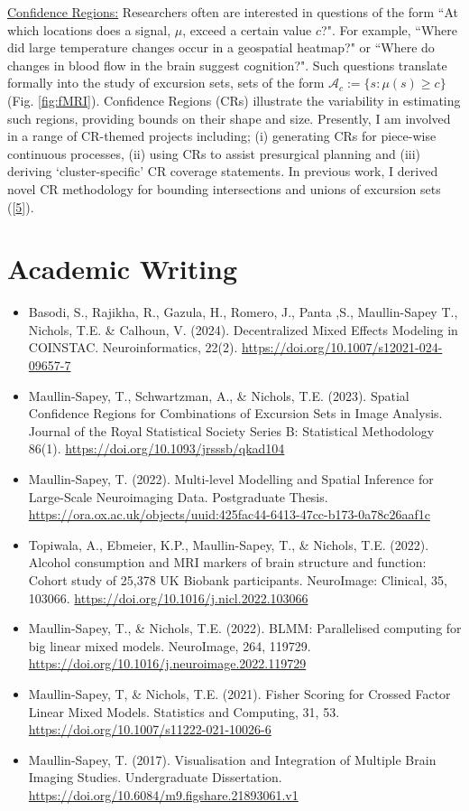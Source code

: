\documentclass{friggeri-cv}
\begin{document}
\underline{Confidence Regions:} Researchers often are interested in questions of the form ``At which locations does a signal, $\mu$, exceed a certain value $c$?". For example, ``Where did large temperature changes occur in a geospatial heatmap?" or ``Where do changes in blood flow in the brain suggest cognition?". Such questions translate formally into the study of excursion sets, sets of the form $\mathcal{A}_c:=\{s:\mu(s)\geq c\}$ (Fig. \ref{fig:fMRI}). Confidence Regions (CRs) illustrate the variability in estimating such regions, providing bounds on their shape and size. Presently, I am involved in a range of CR-themed projects including; (i) generating CRs for piece-wise continuous processes, (ii) using CRs to assist presurgical planning and (iii) deriving `cluster-specific' CR coverage statements. In previous work, I derived novel CR methodology for bounding intersections and unions of excursion sets ([\href{https://doi.org/10.1093/jrsssb/qkad104}{5}]).

\newpage
{}
\section{Academic Writing}
\footnotesize{
\begin{itemize}
    \item Basodi, S., Rajikha, R., Gazula, H., Romero, J., Panta ,S., Maullin-Sapey T., Nichols, T.E. \& Calhoun, V. (2024). Decentralized Mixed Effects Modeling in COINSTAC. Neuroinformatics, 22(2). \url{https://doi.org/10.1007/s12021-024-09657-7}
    \item Maullin-Sapey, T., Schwartzman, A., \& Nichols, T.E. (2023). Spatial Confidence Regions for Combinations of Excursion Sets in Image Analysis. Journal of the Royal Statistical Society Series B: Statistical Methodology 86(1). \url{https://doi.org/10.1093/jrsssb/qkad104}
    \item Maullin-Sapey, T. (2022). Multi-level Modelling and Spatial Inference for Large-Scale Neuroimaging Data. Postgraduate Thesis. \url{https://ora.ox.ac.uk/objects/uuid:425fac44-6413-47cc-b173-0a78c26aaf1c}
    \item Topiwala, A., Ebmeier, K.P., Maullin-Sapey, T., \& Nichols, T.E. (2022). Alcohol consumption and MRI markers of brain structure and function: Cohort study of 25,378 UK Biobank participants. NeuroImage: Clinical, 35, 103066. \url{https://doi.org/10.1016/j.nicl.2022.103066}
    \item Maullin-Sapey, T., \& Nichols, T.E. (2022). BLMM: Parallelised computing for big linear mixed models. NeuroImage, 264, 119729. \url{https://doi.org/10.1016/j.neuroimage.2022.119729}
    \item Maullin-Sapey, T, \& Nichols, T.E. (2021). Fisher Scoring for Crossed Factor Linear Mixed Models. Statistics and Computing, 31, 53. \url{https://doi.org/10.1007/s11222-021-10026-6}
    \item Maullin-Sapey, T. (2017). Visualisation and Integration of Multiple Brain Imaging Studies. Undergraduate Dissertation. \url{https://doi.org/10.6084/m9.figshare.21893061.v1}
\end{itemize}
}
\normalsize
\end{document}
